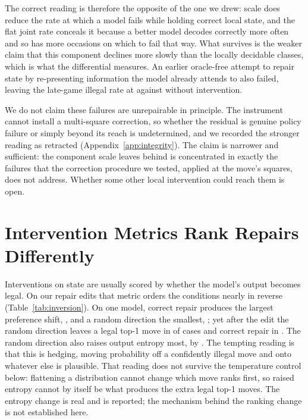 \documentclass[11pt]{article}
\begin{document}
The correct reading is therefore the opposite of the one we drew: scale does reduce
the rate at which a model fails while holding correct local state, and the flat
joint rate conceals it because a better model decodes correctly more often and so
has more occasions on which to fail that way. What survives is the weaker claim
that this component declines more slowly than the locally decidable classes, which
is what the differential measures.
An earlier oracle-free attempt to repair state by re-presenting information the
model already attends to also failed, leaving the late-game illegal rate at
 against  without intervention.

We do not claim these failures are unrepairable in principle. The instrument cannot
install a multi-square correction, so whether the residual is genuine policy
failure or simply beyond its reach is undetermined, and we recorded the stronger
reading as retracted (Appendix~\ref{app:integrity}). The claim is narrower and
sufficient: the component scale leaves behind is concentrated in exactly the
failures that the correction procedure we tested, applied at the move's squares,
does not address. Whether some other local intervention could reach them is open.

\section{Intervention Metrics Rank Repairs Differently}
\label{sec:inversion}

Interventions on state are usually scored by whether the model's output becomes
legal. On our repair edits that metric orders the conditions nearly in reverse
(Table~\ref{tab:inversion}). On one model, correct repair produces the largest
preference shift, , and a random direction the smallest,
; yet after the edit the random direction leaves a legal top-1 move
in  of cases and correct repair in . The random
direction also raises output entropy most, by . The tempting reading is
that this is hedging, moving probability off a confidently illegal move and onto
whatever else is plausible. That reading does not survive the temperature control
below: flattening a distribution cannot change which move ranks first, so raised
entropy cannot by itself be what produces the extra legal top-1 moves. The entropy
change is real and is reported; the mechanism behind the ranking change is not
established here.
\end{document}
